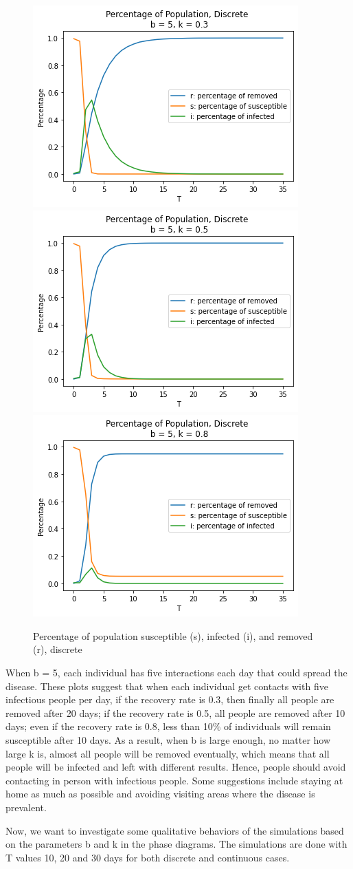 \documentclass{article}
\begin{document}
\begin{figure}[htp]

\centering
\includegraphics[width=.3\textwidth]{Figure1_discrete_sir_b5_k1.png}\hfill
\includegraphics[width=.3\textwidth]{Figure1_discrete_sir_b5_k2.png}\hfill
\includegraphics[width=.3\textwidth]{Figure1_discrete_sir_b5_k3.png}

\caption{Percentage of population susceptible (s), infected (i), and removed (r), discrete}
\label{fig:figure3}

\end{figure}



When b = 5, each individual has five interactions each day that could spread the disease. These plots suggest that when each individual get contacts with five infectious people per day, if the recovery rate is 0.3, then finally all people are removed after 20 days; if the recovery rate is 0.5, all people are removed after 10 days; even if the recovery rate is 0.8, less than 10$\%$ of individuals will remain susceptible after 10 days. As a result, when b is large enough, no matter how large k is, almost all people will be removed eventually, which means that all people will be infected and left with different results. Hence, people should avoid contacting in person with infectious people. Some suggestions include staying at home as much as possible and avoiding visiting areas where the disease is prevalent.


Now, we want to investigate some qualitative behaviors of the simulations based on the parameters b and k in the phase diagrams.
The simulations are done with T values 10, 20 and 30 days for both discrete and continuous cases.
\end{document}
